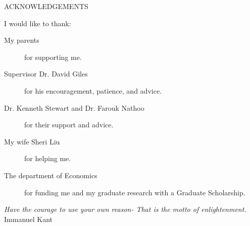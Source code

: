 \newpage
{}

\begin{center}
ACKNOWLEDGEMENTS
\end{center}

\noindent I would like to thank:
\begin{description}
\item[My parents]
	for supporting me.
\item[Supervisor Dr. David Giles]
	for his encouragement, patience, and advice.
\item[Dr. Kenneth Stewart and Dr. Farouk Nathoo]
	for their support and advice.
\item[My wife Sheri Liu]
	for helping me.
\item[The department of Economics]
		for funding me and my graduate research with a Graduate Scholarship.    
    
\end{description}

\begin{flushright}
\textit{Have the courage to use your own reason- That is the motto of enlightenment.}
\\
 Immanuel Kant \\
\end{flushright}